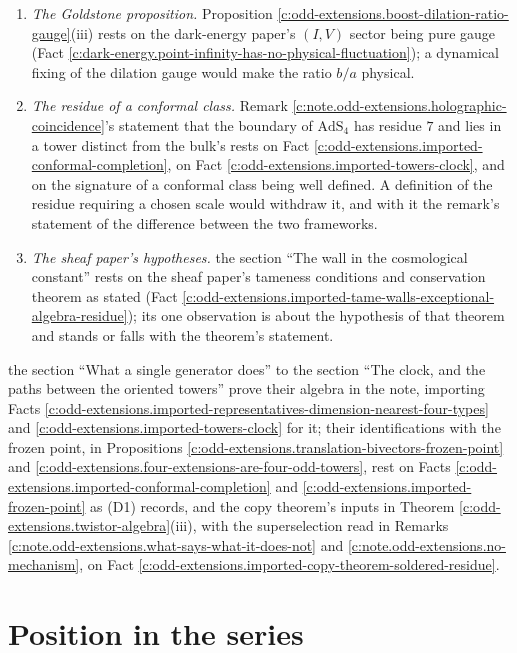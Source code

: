 \documentclass[11pt]{article}
\theoremstyle{definition}
\theoremstyle{plain}
\begin{document}
\begin{enumerate}
\item[(D4)] \emph{The Goldstone proposition.} Proposition \ref{c:odd-extensions.boost-dilation-ratio-gauge}(iii) rests on the dark-energy paper's $(I,V)$ sector being pure gauge (Fact \ref{c:dark-energy.point-infinity-has-no-physical-fluctuation}); a dynamical fixing of the dilation gauge would make the ratio $b/a$ physical.
\item[(D5)] \emph{The residue of a conformal class.} Remark \ref{c:note.odd-extensions.holographic-coincidence}'s statement that the boundary of $\mathrm{AdS}_{4}$ has residue $7$ and lies in a tower distinct from the bulk's rests on Fact \ref{c:odd-extensions.imported-conformal-completion}, on Fact \ref{c:odd-extensions.imported-towers-clock}, and on the signature of a conformal class being well defined. A definition of the residue requiring a chosen scale would withdraw it, and with it the remark's statement of the difference between the two frameworks.
\item[(D6)] \emph{The sheaf paper's hypotheses.} the section ``The wall in the cosmological constant'' rests on the sheaf paper's tameness conditions and conservation theorem as stated (Fact \ref{c:odd-extensions.imported-tame-walls-exceptional-algebra-residue}); its one observation is about the hypothesis of that theorem and stands or falls with the theorem's statement.
\end{enumerate}
the section ``What a single generator does'' to the section ``The clock, and the paths between the oriented towers'' prove their algebra in the note, importing Facts \ref{c:odd-extensions.imported-representatives-dimension-nearest-four-types} and \ref{c:odd-extensions.imported-towers-clock} for it; their identifications with the frozen point, in Propositions \ref{c:odd-extensions.translation-bivectors-frozen-point} and \ref{c:odd-extensions.four-extensions-are-four-odd-towers}, rest on Facts \ref{c:odd-extensions.imported-conformal-completion} and \ref{c:odd-extensions.imported-frozen-point} as (D1) records, and the copy theorem's inputs in Theorem \ref{c:odd-extensions.twistor-algebra}(iii), with the superselection read in Remarks \ref{c:note.odd-extensions.what-says-what-it-does-not} and \ref{c:note.odd-extensions.no-mechanism}, on Fact \ref{c:odd-extensions.imported-copy-theorem-soldered-residue}.

\section{Position in the series}
\end{document}
